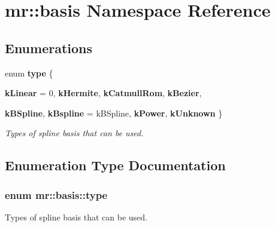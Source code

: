 \section{mr::basis Namespace Reference}
\label{namespacemr_1_1basis}


\subsection*{Enumerations}
\begin{CompactItemize}
\item 
enum {\bf type} \{ \par
{\bf k\-Linear} =  0, 
{\bf k\-Hermite}, 
{\bf k\-Catmull\-Rom}, 
{\bf k\-Bezier}, 
\par
{\bf k\-BSpline}, 
{\bf k\-Bspline} =  k\-BSpline, 
{\bf k\-Power}, 
{\bf k\-Unknown}
 \}
\begin{CompactList}\small\item\em Types of spline basis that can be used. \item\end{CompactList}\end{CompactItemize}


\subsection{Enumeration Type Documentation}
\subsubsection{\setlength{\rightskip}{0pt plus 5cm}enum {\bf mr::basis::type}}\label{namespacemr_1_1basis_a8}


Types of spline basis that can be used. 

